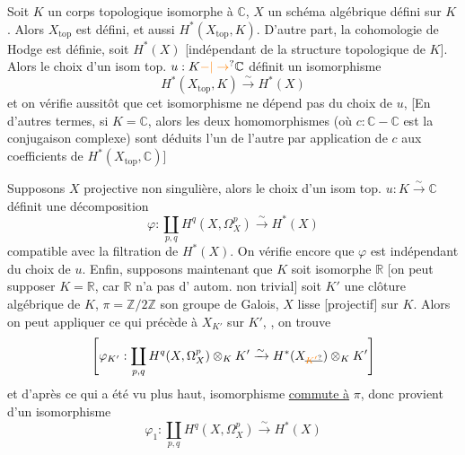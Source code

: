 Soit $K$ un corps topologique isomorphe à $\mathbb C$, $X$ un
schéma algébrique défini sur $K$. Alors $X_{\mathrm{top}}$ est défini,
et aussi $H^*(X_{\mathrm{top}},K)$. D'autre part,  la cohomologie
de Hodge est définie, soit $H^*(X)$ [indépendant de
la structure topologique de $K$]. Alors le choix
d'un isom top. $u:K\unsure{-|\to}\mathbb C$ définit un isomorphisme
\[
H^*(X_{\mathrm{top}},K)\xrightarrow{\sim} H^*(X)
\]
et on vérifie aussitôt que cet isomorphisme ne
dépend pas du choix de $u$, [En d'autres termes,
si $K=\mathbb C$, alors les deux homomorphismes
(où $c:\mathbb C-\mathbb C$ est la conjugaison complexe)
sont  déduits
l'un de l'autre par application de $c$ aux coefficients de $H^*(X_{\mathrm{top}},\mathbb C)$]


Supposons $X$ projective non singulière, alors
le choix d'un isom top. $u:K\xrightarrow{\sim}\mathbb C$ définit
une décomposition
\[
\varphi:\coprod_{p,q}H^q(X,\Omega_X^p)\xrightarrow{\sim}H^*(X)
\]
compatible avec la filtration de $H^*(X)$. On
vérifie encore que $\varphi$ est indépendant du choix de $u$.
Enfin, supposons maintenant que $K$ soit isomorphe
$\mathbb R$ [on peut supposer $K=\mathbb R$, car $\mathbb R$ n'a pas d'
autom. non trivial] soit $K'$ une clôture
algébrique de $K$, $\pi=\mathbb Z/2\mathbb Z$ son groupe de Galois,
$X$ lisse  [projectif] sur $K$. Alors on peut appliquer
ce qui précède à $X_{K'}$ sur $K'$,
, on trouve
\[
\left[\varphi_{K'}:\coprod_{p,q}H^q(X,\Omega_X^p)\otimes_K K'
 \xrightarrow{\sim}H^*(X_{\deleted{\unsure{K'}}})\otimes_K K'\right]
\]
et d'après ce qui a été vu plus haut,
 isomorphisme \uline{commute à} $\pi$, donc provient
d'un isomorphisme
\[
 \varphi_1:\coprod_{p,q} H^q(X,\Omega_X^p)\xrightarrow{\sim}H^*(X)
\]


